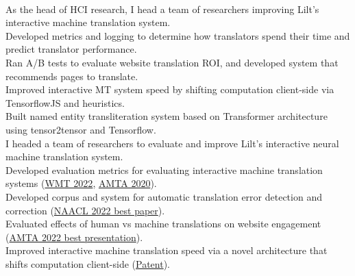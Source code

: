 \\
\ifdefined\hci
As the head of HCI research, I head a team of researchers improving Lilt's interactive machine translation system.\\
Developed metrics and logging to determine how translators spend their time and predict translator performance.\\
Ran A/B tests to evaluate website translation ROI, and developed system that recommends pages to translate. \\
Improved interactive MT system speed by shifting computation client-side via TensorflowJS and heuristics.\\
Built named entity transliteration system based on Transformer architecture using tensor2tensor and Tensorflow.\\  
\else
I headed a team of researchers to evaluate and improve Lilt's interactive neural machine translation system.\\
Developed evaluation metrics for evaluating interactive machine translation systems (\href{https://aclanthology.org/2022.wmt-1.75.pdf}{WMT 2022}, \href{https://aclanthology.org/2020.amta-impact.7/}{AMTA 2020}).\\
Developed corpus and system for automatic translation error detection and correction (\href{https://aclanthology.org/2022.naacl-main.36.pdf}{NAACL 2022 best paper}).\\
Evaluated effects of human vs machine translations on website engagement (\href{https://aclanthology.org/2022.amta-research.23.pdf}{AMTA 2022 best presentation}).\\
Improved interactive machine translation speed via a novel architecture that shifts computation client-side (\href{https://patents.google.com/patent/US20230070302A1}{Patent}).\\
\fi

